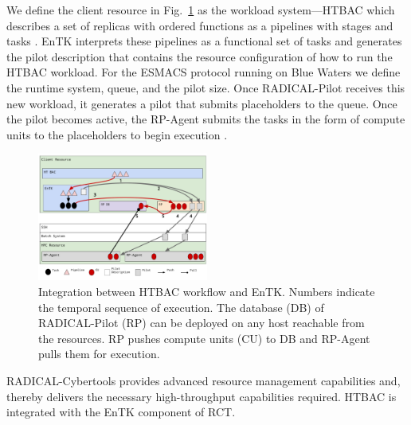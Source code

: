 We define the client resource in Fig.~\ref{figure:ht-bac_rp} as the workload
system---HTBAC which describes a set of
replicas with ordered functions as a pipelines with stages and tasks
. EnTK interprets these pipelines as a functional set
of tasks  and generates the pilot description that contains the resource
configuration of how to run the HTBAC workload. For the ESMACS protocol
running on Blue Waters we define the runtime system, queue, and the pilot
size. Once RADICAL-Pilot receives this new workload, it generates a pilot
that submits placeholders to the queue. Once the pilot %
becomes active, the RP-Agent submits the tasks in the form of compute units
to the placeholders to begin execution .

\begin{figure}
\centering
  \includegraphics[width=0.5\textwidth]{FIGURES/ht-bac-rp_integration.pdf}
  \caption{Integration between HTBAC workflow and EnTK\@. Numbers indicate
  the temporal sequence of execution. The database (DB) of RADICAL-Pilot (RP)
  can be deployed on any host reachable from the resources. RP pushes compute
  units (CU) to DB and RP-Agent pulls them for execution. }\label{figure:ht-bac_rp}
\end{figure}

RADICAL-Cybertools provides advanced resource management capabilities and,
thereby delivers the necessary high-throughput capabilities
required. HTBAC is integrated with the EnTK component of
RCT\@.

